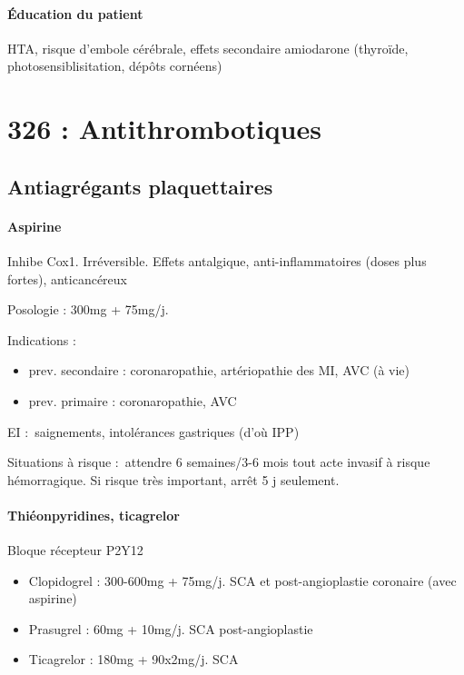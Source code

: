 \paragraph{Éducation du patient}
HTA, risque d'embole cérébrale, effets secondaire amiodarone (thyroïde,
photosensiblisitation, dépôts cornéens)






\section{326 : Antithrombotiques}%
\label{sec:326_antithrombotiques}

\subsection{Antiagrégants plaquettaires}
\paragraph{Aspirine}
Inhibe Cox1. Irréversible. Effets antalgique, anti-inflammatoires (doses plus
fortes), anticancéreux

Posologie : 300mg + 75mg/j.

Indications : 
\begin{itemize}
  \item prev. secondaire : coronaropathie, artériopathie des MI, AVC (à
vie)
\item  prev. primaire : coronaropathie, AVC
\end{itemize}

EI : saignements, intolérances gastriques (d'où IPP)

Situations à risque : attendre 6 semaines/3-6 mois tout acte invasif à risque
hémorragique. Si risque très important, arrêt 5 j seulement.

\paragraph{Thiéonpyridines, ticagrelor}
Bloque récepteur P2Y12
\begin{itemize}
  \item Clopidogrel : 300-600mg + 75mg/j. SCA et post-angioplastie coronaire
    (avec aspirine)
  \item Prasugrel : 60mg + 10mg/j. SCA post-angioplastie 
  \item Ticagrelor : 180mg + 90x2mg/j. SCA 
\end{itemize}


